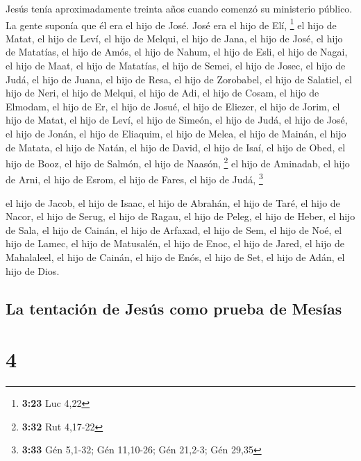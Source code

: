  Jesús tenía aproximadamente treinta años cuando comenzó
su ministerio público. La gente suponía que él era el hijo de José. José
era el hijo de Elí, \footnote{\textbf{3:23} Luc 4,22}  el
hijo de Matat, el hijo de Leví, el hijo de Melqui, el hijo de Jana, el
hijo de José,  el hijo de Matatías, el hijo de Amós, el
hijo de Nahum, el hijo de Esli, el hijo de Nagai,  el
hijo de Maat, el hijo de Matatías, el hijo de Semei, el hijo de Josec,
el hijo de Judá,  el hijo de Juana, el hijo de Resa, el
hijo de Zorobabel, el hijo de Salatiel, el hijo de Neri, 
el hijo de Melqui, el hijo de Adi, el hijo de Cosam, el hijo de Elmodam,
el hijo de Er,  el hijo de Josué, el hijo de Eliezer, el
hijo de Jorim, el hijo de Matat, el hijo de Leví,  el
hijo de Simeón, el hijo de Judá, el hijo de José, el hijo de Jonán, el
hijo de Eliaquim,  el hijo de Melea, el hijo de Mainán,
el hijo de Matata, el hijo de Natán, el hijo de David, 
el hijo de Isaí, el hijo de Obed, el hijo de Booz, el hijo de Salmón, el
hijo de Naasón, \footnote{\textbf{3:32} Rut 4,17-22}  el
hijo de Aminadab, el hijo de Arni, el hijo de Esrom, el hijo de Fares,
el hijo de Judá, \footnote{\textbf{3:33} Gén 5,1-32; Gén 11,10-26; Gén
  21,2-3; Gén 29,35}

 el hijo de Jacob, el hijo de Isaac, el hijo de Abrahán,
el hijo de Taré, el hijo de Nacor,  el hijo de Serug, el
hijo de Ragau, el hijo de Peleg, el hijo de Heber, el hijo de Sala,
 el hijo de Cainán, el hijo de Arfaxad, el hijo de Sem,
el hijo de Noé, el hijo de Lamec,  el hijo de Matusalén,
el hijo de Enoc, el hijo de Jared, el hijo de Mahalaleel, el hijo de
Cainán,  el hijo de Enós, el hijo de Set, el hijo de
Adán, el hijo de Dios.

\hypertarget{la-tentaciuxf3n-de-jesuxfas-como-prueba-de-mesuxedas}{%
\subsection{La tentación de Jesús como prueba de
Mesías}\label{la-tentaciuxf3n-de-jesuxfas-como-prueba-de-mesuxedas}}

\hypertarget{section-3}{%
\section{4}\label{section-3}}

